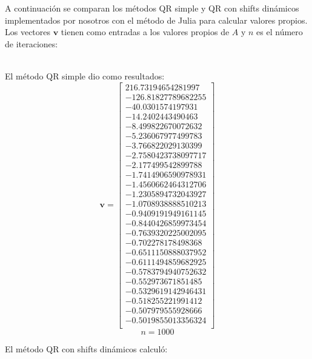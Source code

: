 \documentclass[11pt]{article}
\begin{document}
\noindent
A continuación se comparan los métodos QR simple y QR con shifts dinámicos implementados por nosotros con el método de Julia para calcular valores propios. Los vectores $\textbf{v}$ tienen como entradas a los valores propios de $A$ y $n$ es el número de iteraciones:
\\
\\
\begin{multicols}{3}
\noindent
El método QR simple dio como resultados:
$$
 \textbf{v} =
 \begin{bmatrix}
216.73194654281997 \\
-126.81827789682255 \\
-40.0301574197931 \\
-14.2402443490463 \\
-8.499822670072632 \\
-5.236067977499783 \\
-3.766822029130399 \\
-2.7580423738097717 \\
-2.177499542899788 \\
-1.7414906590978931 \\
-1.4560662464312706 \\
-1.2305894732043927 \\
-1.0708938888510213 \\
-0.9409191949161145 \\
-0.8440426859973454 \\
-0.7639320225002095 \\
-0.702278178498368 \\
-0.6511150888037952 \\
-0.6111494859682925 \\
-0.5783794940752632 \\
-0.552973671851485 \\
-0.5329619142946431 \\
-0.518255221991412 \\
-0.507979555928666 \\
-0.5019855013356324 \\
\end{bmatrix}
$$
 $$n = 1000$$

\noindent
El método QR con shifts dinámicos calculó:


\end{multicols}
\end{document}
